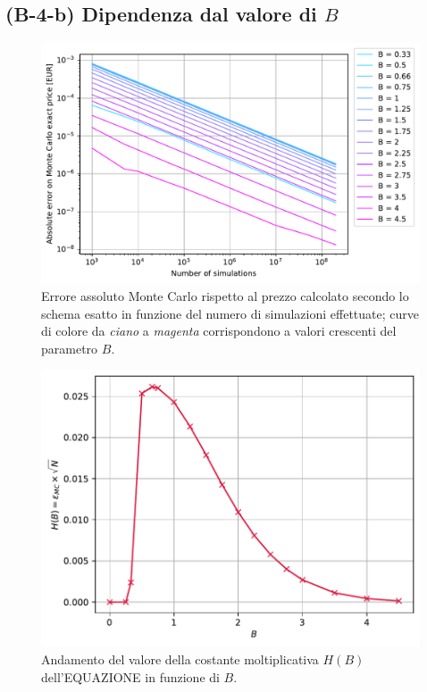 \subsection{(B-4-b) Dipendenza dal valore di $B$}

\begin{figure}[t]
    \centering
    \includegraphics[scale=0.5]{graphs/OptionPriceVsB_ExactErrorVsN_WithAllBs.pdf}
    \caption{Errore assoluto Monte Carlo rispetto al prezzo calcolato secondo lo schema esatto in funzione del numero di simulazioni effettuate; curve di colore da \textit{ciano} a \textit{magenta} corrispondono a valori crescenti del parametro $B$.}
    \label{fig:error_vs_B}
\end{figure}

\begin{figure}[t]
    \centering
    \includegraphics[scale=0.5]{graphs/OptionPriceVsB_HBVsB.pdf}
    \caption{Andamento del valore della costante moltiplicativa $H(B)$ dell'EQUAZIONE in funzione di $B$.}
    \label{fig:HB_vs_B}
\end{figure}

